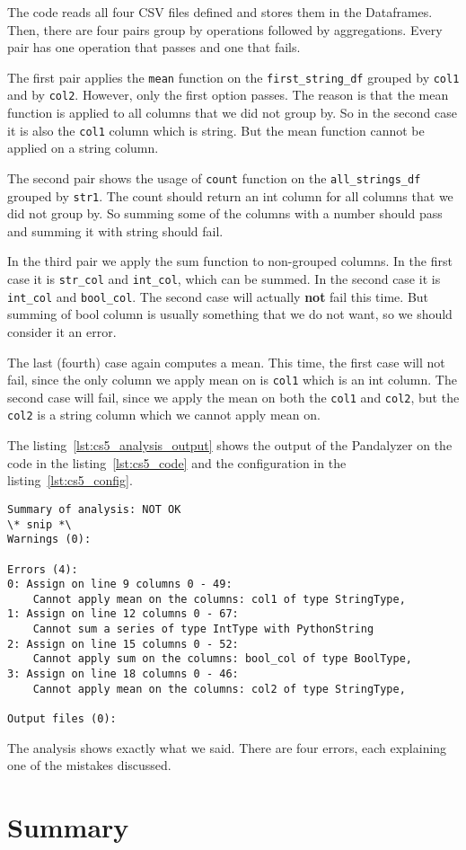 The code reads all four CSV files defined and stores them in the Dataframes.
Then, there are four pairs group by operations followed by aggregations.
Every pair has one operation that passes and one that fails.

The first pair applies the \verb|mean| function on the \verb|first_string_df| grouped by \verb|col1| and by \verb|col2|.
However, only the first option passes.
The reason is that the mean function is applied to all columns that we did not group by.
So in the second case it is also the \verb|col1| column which is string.
But the mean function cannot be applied on a string column.

The second pair shows the usage of \verb|count| function on the \verb|all_strings_df| grouped by \verb|str1|.
The count should return an int column for all columns that we did not group by.
So summing some of the columns with a number should pass and summing it with string should fail.

In the third pair we apply the sum function to non-grouped columns.
In the first case it is \verb|str_col| and \verb|int_col|, which can be summed.
In the second case it is \verb|int_col| and \verb|bool_col|.
The second case will actually \textbf{not} fail this time.
But summing of bool column is usually something that we do not want, so we should consider it an error.

The last (fourth) case again computes a mean.
This time, the first case will not fail, since the only column we apply mean on is \verb|col1| which is an int column.
The second case will fail, since we apply the mean on both the \verb|col1| and \verb|col2|, but the \verb|col2| is
a string column which we cannot apply mean on.

The listing~\ref{lst:cs5_analysis_output} shows the output of the Pandalyzer on the code in the listing~\ref{lst:cs5_code}
and the configuration in the listing~\ref{lst:cs5_config}.

\begin{lstlisting}[caption=Analysis output of the fifth case study, label={lst:cs5_analysis_output}, captionpos=b]
Summary of analysis: NOT OK
\* snip *\
Warnings (0):

Errors (4):
0: Assign on line 9 columns 0 - 49:
    Cannot apply mean on the columns: col1 of type StringType,
1: Assign on line 12 columns 0 - 67:
    Cannot sum a series of type IntType with PythonString
2: Assign on line 15 columns 0 - 52:
    Cannot apply sum on the columns: bool_col of type BoolType,
3: Assign on line 18 columns 0 - 46:
    Cannot apply mean on the columns: col2 of type StringType,

Output files (0):
\end{lstlisting}

The analysis shows exactly what we said.
There are four errors, each explaining one of the mistakes discussed.

\section*{Summary}

